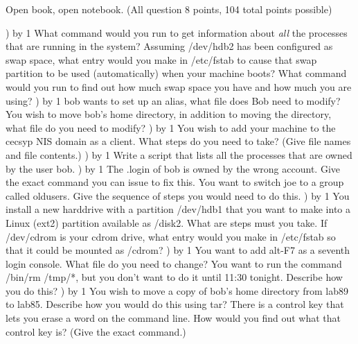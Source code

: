 
\parindent=0in
\nopagenumbers
\newcount\quesno
{}
\def\ques{\number\quesno) \advance\quesno by 1}
\def\aspace{\vskip 1.5in}

Open book, open notebook. (All question 8 points, 104 total points possible)

\ques
What command would you run to get information about {\it{}all}
the processes that are running in the system?
\vskip 0.5in
Assuming {\ltt{}/dev/hdb2} has been configured as swap space,
what entry would you make in {\ltt{}/etc/fstab} to cause that
swap partition to be used (automatically) when your machine boots?
\vskip 0.5in
What command would you run to find out how much swap space
you have and how much you are using?
\vskip 0.5in
\ques
{\ltt{}bob} wants to set up an alias, what
file does Bob need to modify?
\vskip 0.5in
You wish to move {\ltt{}bob}'s home directory,
in addition to moving the directory,
what file do you need to modify?
\vskip 0.5in
\ques
You wish to add your machine to the {\ltt{}cecsyp} NIS domain
as a client.
What steps do you need to take?
(Give file names and file contents.)
\vskip 2.0in
\ques
Write a script that lists all the processes 
that are owned by the user {\ltt{}bob}.
\vfill\eject
\ques
The {\ltt{}.login} of {\ltt{}bob} is owned by the wrong account.
Give the exact command you can issue to fix this.
\vskip 0.5in
You want to switch {\ltt{}joe} to a group called {\ltt{}oldusers}.
Give the sequence of steps you would need to do this.
\vskip 2.0in
\ques
You install a new harddrive with a partition
{\ltt{}/dev/hdb1} that you want to make into
a Linux (ext2) partition available as {\ltt{}/disk2}.
What are steps must you take.
\vskip 2.0in
If {\ltt{}/dev/cdrom} is your cdrom drive,
what entry would you make in {\ltt{}/etc/fstab} so that
it could be mounted as {\ltt{}/cdrom}?
\vskip 0.5in
\ques
You want to add {\ltt{}alt-F7} as a seventh login console.
What file do you need to change?
\vskip 0.5in
You want to run the command {\ltt{}/bin/rm /tmp/*},
but you don't want to do it until 11:30 tonight.
Describe how you do this?
\vfill\eject
\ques
You wish to move a copy of bob's home directory
from lab89 to lab85.
Describe how you would do this using tar?
\vskip 1.8in
There is a control key that lets you erase a word
on the command line.
How would you find out what that control key is?
(Give the exact command.)

